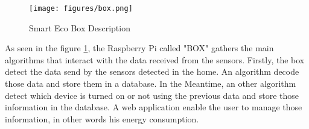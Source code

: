 \begin{figure}[H]
\centering
\texttt{[image: figures/box.png]}
\caption{Smart Eco Box Description}
\label{fig:boxDescription}
\end{figure}

As seen in the figure \ref{fig:boxDescription}, the Raspberry Pi called "BOX" gathers the main algorithms that interact with the data received from the sensors. Firstly, the box detect the data send by the sensors detected in the home. An algorithm decode those data and store them in a database. In the Meantime, an other algorithm detect which device is turned on or not using the previous data and store those information in the database. A web application enable the user to manage those information, in other words his energy consumption.

